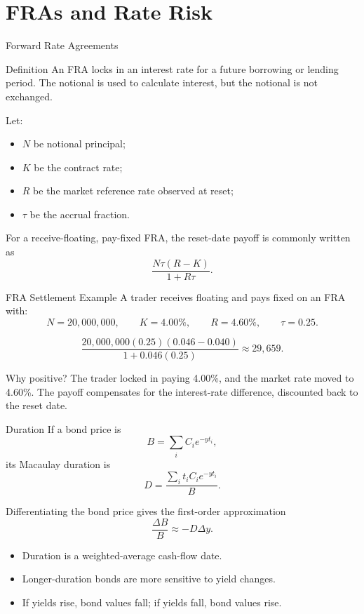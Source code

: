 \documentclass[aspectratio=169,11pt]{beamer}
\newcommand{\notional}{N}
\newcommand{\Dur}{D}
\begin{document}
\section{FRAs and Rate Risk}

\begin{frame}{Forward Rate Agreements}
    \begin{block}{Definition}
        An FRA locks in an interest rate for a future borrowing or lending period.
        The notional is used to calculate interest, but the notional is not exchanged.
    \end{block}

    Let:
    \begin{itemize}
        \item \(\notional\) be notional principal;
        \item \(K\) be the contract rate;
        \item \(R\) be the market reference rate observed at reset;
        \item \(\tau\) be the accrual fraction.
    \end{itemize}

    For a receive-floating, pay-fixed FRA, the reset-date payoff is commonly written as
    \[
        \frac{\notional \tau (R-K)}{1+R\tau}.
    \]
\end{frame}

\begin{frame}{FRA Settlement Example}
    \small
    A trader receives floating and pays fixed on an FRA with:
    \[
        \notional=20{,}000{,}000,\qquad
        K=4.00\%,\qquad
        R=4.60\%,\qquad
        \tau=0.25.
    \]

    \[
        \frac{20{,}000{,}000(0.25)(0.046-0.040)}
        {1+0.046(0.25)}
        \approx 29{,}659.
    \]

    \begin{block}{Why positive?}
        The trader locked in paying 4.00\%, and the market rate moved to 4.60\%.
        The payoff compensates for the interest-rate difference, discounted back to the reset date.
    \end{block}
\end{frame}

\begin{frame}{Duration}
    If a bond price is
    \[
        B=\sum_i C_i e^{-y t_i},
    \]
    its Macaulay duration is
    \[
        \Dur=\frac{\sum_i t_i C_i e^{-y t_i}}{B}.
    \]

    Differentiating the bond price gives the first-order approximation
    \[
        \frac{\Delta B}{B}\approx -\Dur\Delta y.
    \]

    \begin{itemize}
        \item Duration is a weighted-average cash-flow date.
        \item Longer-duration bonds are more sensitive to yield changes.
        \item If yields rise, bond values fall; if yields fall, bond values rise.
    \end{itemize}
\end{frame}
\end{document}
